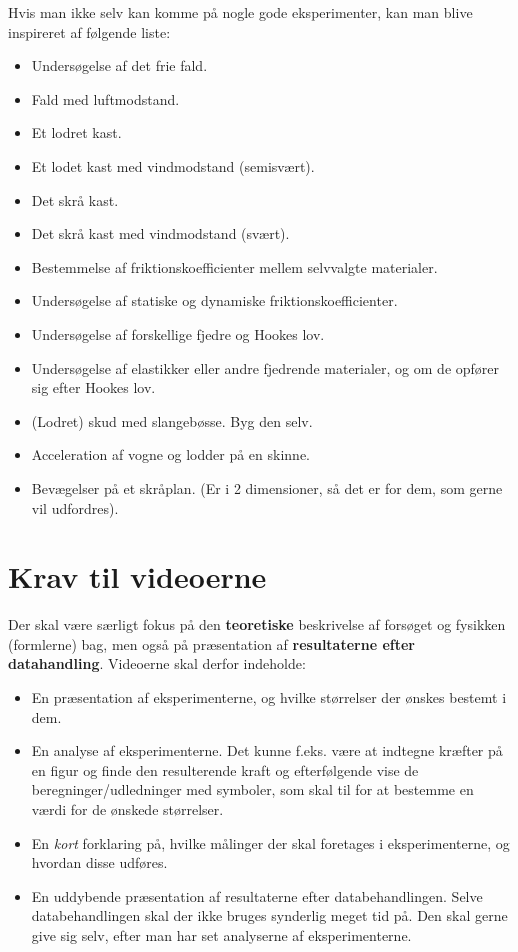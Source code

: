 \documentclass[a4paper, 12pt]{article}
\begin{document}
Hvis man ikke selv kan komme på nogle gode eksperimenter, kan man blive inspireret af følgende liste:
\begin{itemize}
\item Undersøgelse af det frie fald.
\item Fald med luftmodstand.
\item Et lodret kast.
\item Et lodet kast med vindmodstand (semisvært).
\item Det skrå kast.
\item Det skrå kast med vindmodstand (svært).
\item Bestemmelse af friktionskoefficienter mellem selvvalgte materialer.
\item Undersøgelse af statiske og dynamiske friktionskoefficienter.
\item Undersøgelse af forskellige fjedre og Hookes lov.
\item Undersøgelse af elastikker eller andre fjedrende materialer, og om de opfører sig efter Hookes lov.
\item (Lodret) skud med slangebøsse. Byg den selv.
\item Acceleration af vogne og lodder på en skinne.
\item Bevægelser på et skråplan. (Er i 2 dimensioner, så det er for dem, som gerne vil udfordres).
\end{itemize}

\newpage

\section*{Krav til videoerne}
\label{sec:org8b386f5}
Der skal være særligt fokus på den \textbf{teoretiske} beskrivelse af forsøget og fysikken (formlerne) bag, men også på præsentation af \textbf{resultaterne efter datahandling}. Videoerne skal derfor indeholde:
\begin{itemize}
\item En præsentation af eksperimenterne, og hvilke størrelser der ønskes bestemt i dem.
\item En analyse af eksperimenterne. Det kunne f.eks. være at indtegne kræfter på en figur og finde den resulterende kraft og efterfølgende vise de beregninger/udledninger med symboler, som skal til for at bestemme en værdi for de ønskede størrelser.
\item En \emph{kort} forklaring på, hvilke målinger der skal foretages i eksperimenterne, og hvordan disse udføres.
\item En uddybende præsentation af resultaterne efter databehandlingen. Selve databehandlingen skal der ikke bruges synderlig meget tid på. Den skal gerne give sig selv, efter man har set analyserne af eksperimenterne.
\end{itemize}
\end{document}
